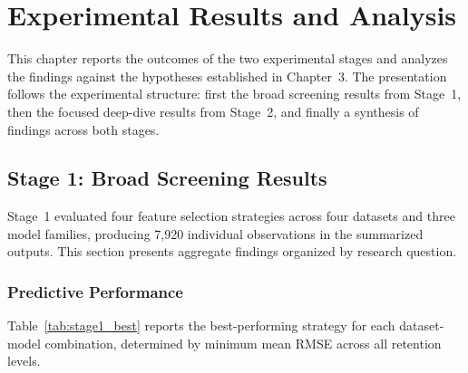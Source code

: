 \chapter{Experimental Results and Analysis}

This chapter reports the outcomes of the two experimental stages and analyzes the findings against the hypotheses established in Chapter~3. The presentation follows the experimental structure: first the broad screening results from Stage~1, then the focused deep-dive results from Stage~2, and finally a synthesis of findings across both stages.

\section{Stage 1: Broad Screening Results}

Stage~1 evaluated four feature selection strategies across four datasets and three model families, producing 7,920 individual observations in the summarized outputs. This section presents aggregate findings organized by research question.

\subsection{Predictive Performance}

Table~\ref{tab:stage1_best} reports the best-performing strategy for each dataset-model combination, determined by minimum mean RMSE across all retention levels.

